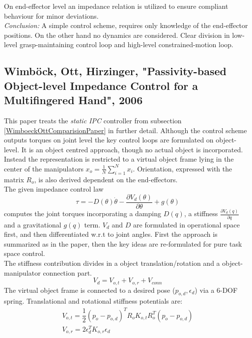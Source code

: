 \documentclass[conference]{IEEEtran}
\begin{document}
On end-effector level an impedance relation is utilized to ensure compliant behaviour for minor deviations.\\
\textit{Conclusion:} A simple control scheme, requires only knowledge of the end-effector positions. On the other hand no dynamics are considered. Clear division in low-level grasp-maintaining control loop and high-level constrained-motion loop.


\subsection{Wimb\"ock, Ott, Hirzinger, "Passivity-based Object-level Impedance Control for a Multifingered Hand", 2006}

This paper treats the \textit{static IPC} controller from subsection \ref{WimboeckOttComparisionPaper} in further detail. Although the control scheme outputs torques on joint level the key control loops are formulated on object-level. It is an object centred approach, though no actual object is incorporated. Instead the representation is restricted to a virtual object frame lying in the center of the manipulators $ x_o = \frac{1}{N}\sum\nolimits_{i=1}^N x_i $. Orientation, expressed with the matrix $ R_o $, is also derived dependent on the end-effectors.\\
The given impedance control law
\begin{equation}
\tau = -D(\theta)\dot{\theta} - \frac{\partial V_d(\theta)}{\partial \theta} + g(\theta)
\end{equation}
computes the joint torques incorporating a damping $ D(q) $, a stiffness $ \frac{\partial V_d(q)}{\partial q} $ and a gravitational $ g(q) $ term. $ V_d $ and $ D $ are formulated in operational space first, and then differentiated w.r.t to joint angles. First the approach is summarized as in the paper, then the key ideas are re-formulated for pure task space control.\\  
The stiffness contribution divides in a object translation/rotation and a object-manipulator connection part.
\begin{equation}
V_d = V_{o,t} + V_{o,r} + V_{conn}
\end{equation}
The virtual object frame is connected to a desired pose ($ p_{o,d},\epsilon_d $) via a 6-DOF spring. Translational and rotational stiffness potentials are: 
\begin{subequations}
\begin{align}
V_{o,t} = \dfrac{1}{2} (p_o-p_{o,d})^T R_o K_{o,t} R_o^T (p_o-p_{o,d}) \\
V_{o,r} = 2\epsilon_d^T K_{o,r} \epsilon_d 
\end{align}
\label{objectpotentials}
\end{subequations}
\end{document}
